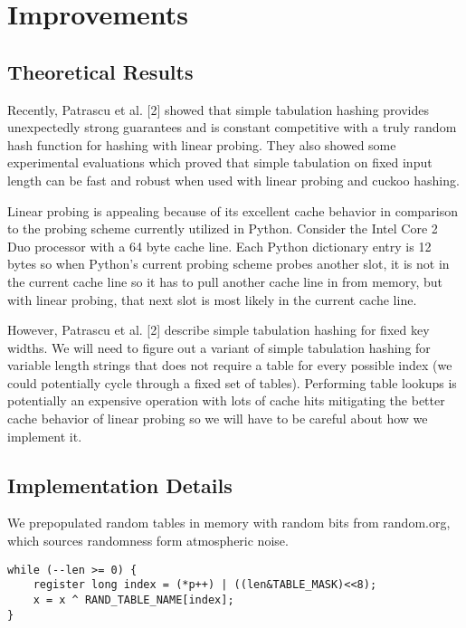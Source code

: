 \documentclass[11pt]{article}
\begin{document}
\section{Improvements}
\subsection{Theoretical Results}
Recently, Patrascu et al. [2] showed that simple tabulation hashing provides unexpectedly strong guarantees and is constant competitive with a truly random hash function for hashing with linear probing. They also showed some experimental evaluations which proved that simple tabulation on fixed input length can be fast and robust when used with linear probing and cuckoo hashing. 




Linear probing is appealing because of its excellent cache behavior in comparison to the probing scheme currently utilized in Python.  Consider the Intel Core 2 Duo processor with a 64 byte cache line.  Each Python dictionary entry is 12 bytes so when Python’s current probing scheme probes another slot, it is not in the current cache line so it has to pull another cache line in from memory, but with linear probing, that next slot is most likely in the current cache line.




However, Patrascu et al. [2] describe simple tabulation hashing for fixed key widths.  We will need to figure out a variant of simple tabulation hashing for variable length strings that does not require a table for every possible index (we could potentially cycle through a fixed set of tables).  Performing table lookups is potentially an expensive operation with lots of cache hits mitigating the better cache behavior of linear probing so we will have to be careful about how we implement it.




\subsection{Implementation Details}
We prepopulated random tables in memory with random bits from random.org, which sources randomness form atmospheric noise.

\begin{verbatim}
while (--len >= 0) {
    register long index = (*p++) | ((len&TABLE_MASK)<<8);
    x = x ^ RAND_TABLE_NAME[index];
}
\end{verbatim}
\end{document}
